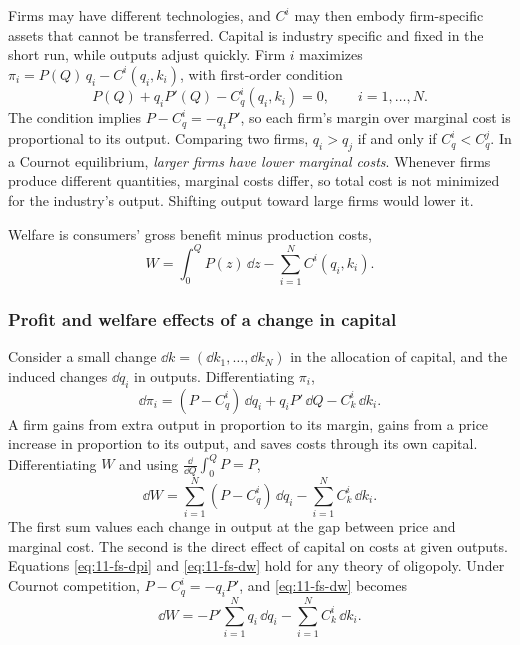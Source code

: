 Firms may have different technologies, and $C^i$ may then embody firm-specific assets that cannot be transferred.
Capital is industry specific and fixed in the short run, while outputs adjust quickly. Firm $i$ maximizes
$\pi_i = P(Q)\,q_i - C^i(q_i, k_i)$, with first-order condition
\begin{equation}\label{eq:11-fs-foc}
P(Q) + q_i P'(Q) - C^i_q(q_i, k_i) = 0, \qquad i = 1, \dots, N.
\end{equation}
The condition implies $P - C^i_q = -q_i P'$, so each firm's margin over marginal cost is proportional to its
output. Comparing two firms, $q_i > q_j$ if and only if $C^i_q < C^j_q$. In a Cournot equilibrium, \emph{larger
firms have lower marginal costs}. Whenever firms produce different quantities, marginal costs differ, so total
cost is not minimized for the industry's output. Shifting output toward large firms would lower it.

Welfare is consumers' gross benefit minus production costs,
\begin{equation*}
W = \int_0^Q P(z)\,\dd z - \sum_{i=1}^{N} C^i(q_i, k_i).
\end{equation*}

\subsubsection{Profit and welfare effects of a change in capital}

Consider a small change $\dd k = (\dd k_1, \dots, \dd k_N)$ in the allocation of capital, and the induced changes
$\dd q_i$ in outputs. Differentiating $\pi_i$,
\begin{equation}\label{eq:11-fs-dpi}
\dd\pi_i = (P - C^i_q)\,\dd q_i + q_i P'\,\dd Q - C^i_k\,\dd k_i .
\end{equation}
A firm gains from extra output in proportion to its margin, gains from a price increase in proportion to its
output, and saves costs through its own capital. Differentiating $W$ and using $\frac{\dd}{\dd Q}\int_0^Q P = P$,
\begin{equation}\label{eq:11-fs-dw}
\dd W = \sum_{i=1}^{N} (P - C^i_q)\,\dd q_i - \sum_{i=1}^{N} C^i_k\,\dd k_i .
\end{equation}
The first sum values each change in output at the gap between price and marginal cost. The second is the direct
effect of capital on costs at given outputs. Equations \eqref{eq:11-fs-dpi} and \eqref{eq:11-fs-dw} hold for any
theory of oligopoly. Under Cournot competition, $P - C^i_q = -q_i P'$, and \eqref{eq:11-fs-dw} becomes
\begin{equation}\label{eq:11-fs-dw-cournot}
\dd W = -P'\sum_{i=1}^{N} q_i\,\dd q_i - \sum_{i=1}^{N} C^i_k\,\dd k_i .
\end{equation}

